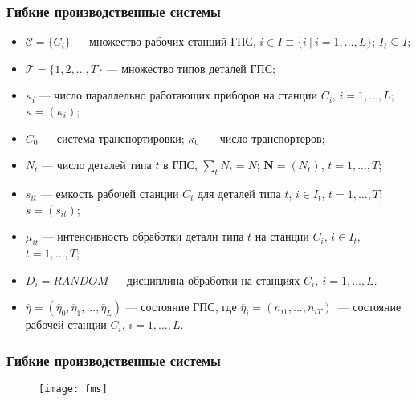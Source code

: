 
\begin{frame} \frametitle{Гибкие производственные системы}
\begin{itemize}
\item $\mathscr{C}=\{C_i\}$ --- множество рабочих станций ГПС, $i \in I \equiv \{ i ~|~ i=1,...,L \}$; $I_t \subseteq I$;

\item $\mathscr{T}=\{1,2,...,T\}$ --- множество типов деталей ГПС;

\item $\kappa_i$ --- число параллельно работающих приборов на станции $C_i$, $i=1,...,L$; $\kappa = (\kappa_i)$;

\item $C_0$ --- система транспортировки; $\kappa_0$~--- число транспортеров;

\item $N_t$ --- число деталей типа $t$ в ГПС, $\sum\limits_t N_t = N$; $\mathbf{N}=(N_t)$, $t=1,...,T$;

\item $s_{it}$ --- емкость рабочей станции $C_i$ для деталей типа $t$, $i \in I_t$, $t=1,...,T$; $s = (s_{it})$;

\item $\mu_{it}$ --- интенсивность обработки детали типа $t$ на станции $C_i$, $i \in I_t$, $t=1,...,T$;

\item $D_i = RANDOM$ --- дисциплина обработки на станциях $C_i,~i=1,...,L$.

\item $\overline{\eta} = (\overline{\eta}_0, \overline{\eta}_1,...,\overline{\eta}_L)$ --- состояние ГПС, где $\overline{\eta}_i = (n_{i1},...,n_{iT})$~--- состояние рабочей станции $C_i$, $i=1,...,L$.
\end{itemize}
\end{frame}


\begin{frame} \frametitle{Гибкие производственные системы}
\begin{figure}[H]
  \centering
  \texttt{[image: fms]}
  \label{fig:main}
\end{figure}
\end{frame}


